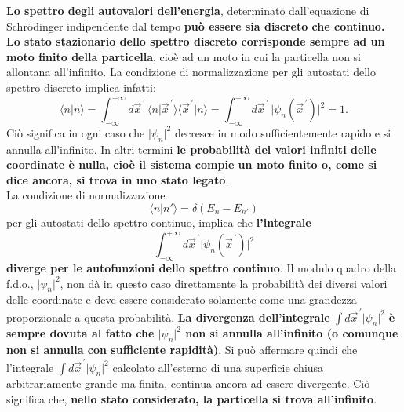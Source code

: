 \textbf{Lo spettro degli autovalori dell'energia}, determinato dall'equazione di Schr\"{o}dinger indipendente dal tempo \textbf{può essere sia discreto che continuo. Lo stato stazionario dello spettro discreto corrisponde sempre ad un moto finito della particella}, cioè ad un moto in cui la particella non si allontana all'infinito. La condizione di normalizzazione per gli autostati dello spettro discreto implica infatti:
	\begin{equation}
		\langle n \vert n \rangle = \int _{- \infty} ^{+\infty} d{\vec{x}}^{\, \prime}\,\langle n \vert {\vec{x}}^{\, \prime} \rangle \langle {\vec{x}}^{\, \prime} \vert n \rangle = \int _{- \infty} ^{+\infty} d{\vec{x}}^{\, \prime}\, \vert \psi _n ({\vec{x}}^{\, \prime}) \vert ^2 =1.
	\end{equation}
Ciò significa in ogni caso che $ \vert \psi _n  \vert ^2$ decresce in modo sufficientemente rapido e si annulla all'infinito. In altri termini \textbf{le probabilità dei valori infiniti delle coordinate è nulla, cioè il sistema compie un moto finito o, come si dice ancora, si trova in uno stato legato}.\\

La condizione di normalizzazione
	\begin{equation}
		\langle n \vert n' \rangle = \delta (E_n - E_{n'})
	\end{equation}
per gli autostati dello spettro continuo, implica che \textbf{l'integrale}
	\begin{equation}
		\int _{- \infty} ^{+\infty} d{\vec{x}}^{\, \prime} \vert \psi _n ({\vec{x}}^{\, \prime}) \vert ^2
	\end{equation}
\textbf{diverge per le autofunzioni dello spettro continuo}. Il modulo quadro della f.d.o., $\vert \psi _n \vert ^2 $, non dà in questo caso direttamente la probabilità dei diversi valori delle coordinate e deve essere considerato solamente come una grandezza proporzionale a questa probabilità. \textbf{La divergenza dell'integrale} $ \int  d{\vec{x}}^{\, \prime} \vert \psi _n  \vert ^2$ \textbf{è sempre dovuta al fatto che $\vert \psi _n  \vert ^2$ non si annulla all'infinito (o comunque non si annulla con sufficiente rapidità)}. Si può affermare quindi che l'integrale $ \int  d{\vec{x}}^{\, \prime} \vert \psi _n  \vert ^2$ calcolato all'esterno di una superficie chiusa arbitrariamente grande ma finita, continua ancora ad essere divergente. Ciò significa che, \textbf{nello stato considerato, la particella si trova all'infinito}.\\

